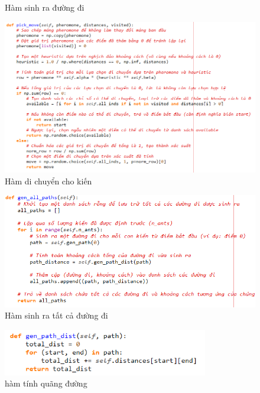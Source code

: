 \documentclass[14pt]{article}
\begin{document}
\begin{center}
\begin{figure}[htbp]
			\caption{Hàm sinh ra đường đi}
			\label{fig:mylabel}
		\end{figure}
		\begin{figure}[htbp]
			\centering
			\includegraphics[width=\textwidth]{./Image/Hàm kiến di chuyển ACO.png}
			\caption{Hàm di chuyển cho kiến}
			\label{fig:mylabel}
		\end{figure}
		\begin{figure}[htbp]
			\centering
			\includegraphics[width=\textwidth]{./Image/Hàm sinh ra tất cả các đường ACO.png}
			\caption{Hàm sinh ra tất cả đường đi}
			\label{fig:mylabel}
		\end{figure}
		\begin{figure}[htbp]
			\centering
			\includegraphics[width=0.8\textwidth]{./Image/Hàm tính quãng đường ACO.png}
			\caption{hàm tính quãng đường}
			\label{fig:mylabel}
		\end{figure}
		\begin{figure}[htbp]

\end{figure}
\end{center}
\end{document}
